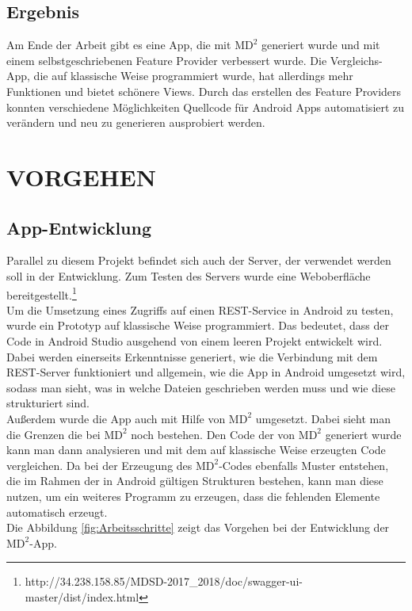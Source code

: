 \documentclass[a4paper,twoside]{article}
\begin{document}
	\subsection{Ergebnis}
	Am Ende der Arbeit gibt es eine App, die mit $\text{MD}^2$ generiert wurde und mit einem selbstgeschriebenen Feature Provider verbessert wurde. Die Vergleichs-App, die auf klassische Weise programmiert wurde, hat allerdings mehr Funktionen und bietet sch\"onere Views. Durch das erstellen des Feature Providers konnten verschiedene M\"oglichkeiten Quellcode f\"ur Android Apps automatisiert zu ver\"andern und neu zu generieren ausprobiert werden.
	
	\section{\uppercase{Vorgehen}}
	
	\subsection{App-Entwicklung}
	
	\noindent Parallel zu diesem Projekt befindet sich auch der Server, der verwendet werden soll in der Entwicklung. Zum Testen des Servers wurde eine Web\-ober\-fl\"ache bereitgestellt.\footnote{http://34.238.158.85/MDSD-2017\_2018/doc/swagger-ui-master/dist/index.html} \\
	Um die Umsetzung eines Zugriffs auf einen REST-Service in Android zu testen, wurde ein Prototyp auf klassische Weise programmiert. Das bedeutet, dass der Code in Android Studio ausgehend von einem leeren Projekt entwickelt wird. Dabei werden einerseits Erkenntnisse generiert, wie die Verbindung mit dem REST-Server funktioniert und allgemein, wie die App in Android umgesetzt wird, sodass man sieht, was in welche Dateien geschrieben werden muss und wie diese strukturiert sind.\\
	Au\ss{}erdem wurde die App auch mit Hilfe von $\text{MD}^2$ umgesetzt. Dabei sieht man die Grenzen die bei $\text{MD}^2$ noch bestehen. Den Code der von $\text{MD}^2$ generiert wurde kann man dann analysieren und mit dem auf klassische Weise erzeugten Code vergleichen. Da bei der Erzeugung des $\text{MD}^2$-Codes ebenfalls Muster entstehen, die im Rahmen der in Android g\"ultigen Strukturen bestehen, kann man diese nutzen, um ein weiteres Programm zu erzeugen, dass die fehlenden Elemente automatisch erzeugt.\\
	Die Abbildung \ref{fig:Arbeitsschritte} zeigt das Vorgehen bei der Entwicklung der $\text{MD}^2$-App.
	
\end{document}
